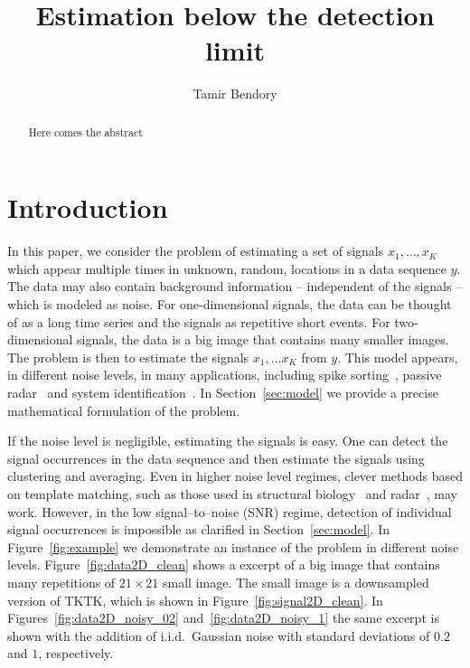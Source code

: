 \documentclass[english]{article}
\numberwithin{equation}{section}
\theoremstyle{plain}
\theoremstyle{definition}
\theoremstyle{remark}
\theoremstyle{plain}
\theoremstyle{remark}
\theoremstyle{plain}
\theoremstyle{plain}
\newcommand{\SNR}{{\textsf{SNR}}}
\begin{document}
\title{Estimation below the detection limit}


\author{Tamir Bendory}
\maketitle

\begin{abstract}
	Here comes the abstract
\end{abstract}

\section{Introduction}

In this paper, we consider the problem of estimating a set of signals $x_1,\ldots,x_K$ which appear multiple times in unknown, random, locations in a data sequence $y$. The data may also contain background information -- independent of the signals -- which is modeled as noise.
For one-dimensional signals, the data can be thought of as a long time series and the signals as repetitive short events. For two-dimensional signals, the data is a big image that contains many smaller images.  
The problem is then to estimate the signals $x_1,\ldots x_K$ from $y$. This
model appears, in different noise levels, in many applications, including spike sorting~\cite{lewicki1998review}, passive radar~\cite{gogineni2017passive} and system identification~\cite{ljung1998system}.
In Section~\ref{sec:model} we provide a precise mathematical formulation of the problem.

If the noise level is negligible, estimating the signals is easy.
One can detect the signal occurrences in the data sequence and then estimate the signals using clustering and averaging.
Even in higher noise level regimes, clever methods based on template matching, such as those used in structural biology~\cite{heimowitz2018apple} and radar~\cite{gogineni2017passive}, may work.
However, in the low signal--to--noise (\SNR) regime, detection of individual signal occurrences is impossible as clarified in Section~\ref{sec:model}. In Figure~\ref{fig:example} we demonstrate an instance of the problem in different noise levels. Figure~\ref{fig:data2D_clean} shows a excerpt of a big image that contains many repetitions of $21\times 21$ small image. The small image is a downsampled version of TKTK, which is shown in Figure~\ref{fig:signal2D_clean}. In Figures~\ref{fig:data2D_noisy_02} and~\ref{fig:data2D_noisy_1} the same excerpt is shown with the addition of i.i.d.\ Gaussian noise with standard deviations of $0.2$ and $1$, respectively.  
\end{document}

